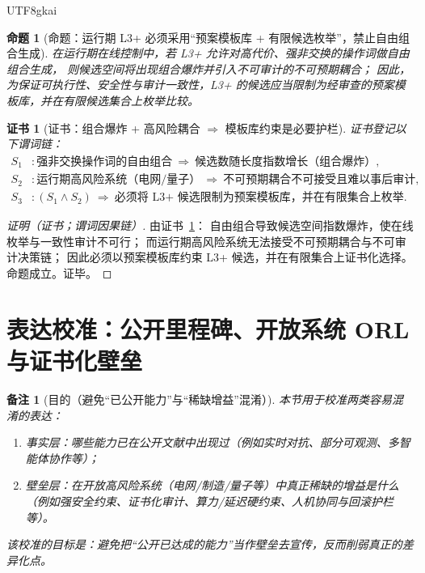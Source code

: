 \documentclass[12pt]{article}
\newtheorem{proposition}{命题}[section]
\newtheorem{remark}{备注}[section]
\newtheorem{Certificate}{证书}[section]
\begin{document}
\begin{CJK*}{UTF8}{gkai}
\begin{proposition}[命题：运行期 L3+ 必须采用“预案模板库 + 有限候选枚举”，禁止自由组合生成]
\label{prop:online-l3plus-template-only}
在运行期在线控制中，若 L3+ 允许对高代价、强非交换的操作词做自由组合生成，
则候选空间将出现组合爆炸并引入不可审计的不可预期耦合；
因此，为保证可执行性、安全性与审计一致性，L3+ 的候选应当限制为经审查的预案模板库，并在有限候选集合上枚举比较。
\end{proposition}

\begin{Certificate}[证书：组合爆炸 + 高风险耦合 $\Rightarrow$ 模板库约束是必要护栏]
\label{cert:online-l3plus-template-only}
证书登记以下谓词链：
\[
\begin{aligned}
  S_1 &: \text{强非交换操作词的自由组合}\ \Rightarrow\ \text{候选数随长度指数增长（组合爆炸）},\\
  S_2 &: \text{运行期高风险系统（电网/量子）}\ \Rightarrow\ \text{不可预期耦合不可接受且难以事后审计},\\
  S_3 &: (S_1\wedge S_2)\ \Rightarrow\ \text{必须将 L3+ 候选限制为预案模板库，并在有限集合上枚举}.
\end{aligned}
\]
\end{Certificate}

\begin{proof}[证明（证书；谓词因果链）]
由证书~\ref{cert:online-l3plus-template-only}：
自由组合导致候选空间指数爆炸，使在线枚举与一致性审计不可行；
而运行期高风险系统无法接受不可预期耦合与不可审计决策链；
因此必须以预案模板库约束 L3+ 候选，并在有限集合上证书化选择。
命题成立。证毕。
\end{proof}

\section{表达校准：公开里程碑、开放系统 ORL 与证书化壁垒}
\label{sec:calibration-public-open-orl}

\begin{remark}[目的（避免“已公开能力”与“稀缺增益”混淆）]
本节用于校准两类容易混淆的表达：
\begin{enumerate}
  \item 事实层：哪些能力已在公开文献中出现过（例如实时对抗、部分可观测、多智能体协作等）；
  \item 壁垒层：在开放高风险系统（电网/制造/量子等）中真正稀缺的增益是什么（例如强安全约束、证书化审计、算力/延迟硬约束、人机协同与回滚护栏等）。
\end{enumerate}
该校准的目标是：避免把“公开已达成的能力”当作壁垒去宣传，反而削弱真正的差异化点。
\end{remark}


\end{CJK*}
\end{document}
